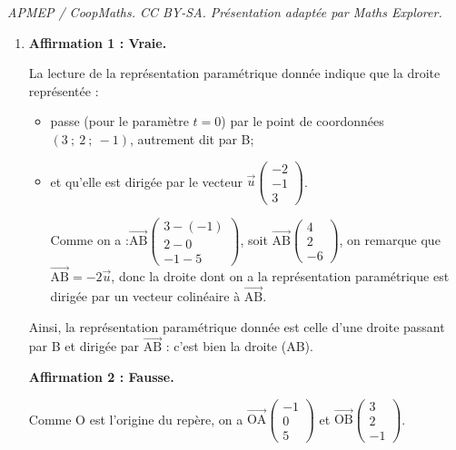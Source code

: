 \documentclass[10pt]{article}
\providecommand{\vect}[1]{\overrightarrow{#1}}
\begin{document}
\noindent\textit{APMEP / CoopMaths. CC BY-SA. Présentation adaptée par Maths Explorer.}\par\medskip
\medskip

\begin{enumerate}
	\item \textbf{Affirmation 1 : Vraie.}

	La lecture de la représentation paramétrique donnée indique que la droite représentée :
	\begin{itemize}
		\item passe (pour le paramètre $t=0$) par le point de coordonnées $(3 ~;~ 2 ~;~ -1)$, autrement dit par B;
		\item et qu'elle est dirigée par le vecteur $\vect{u} \begin{pmatrix}-2 \\-1 \\ 3\end{pmatrix}$.

		Comme on a :\quad $\vect{\mathrm{AB}} \begin{pmatrix} 3 - (-1) \\ 2 - 0 \\ -1 - 5\end{pmatrix}$, soit $\vect{\mathrm{AB}} \begin{pmatrix} 4 \\ 2 \\ -6\end{pmatrix}$, on remarque que $\vect{\mathrm{AB}} = -2\vect{u}$, donc la droite dont on a la représentation paramétrique est dirigée par un vecteur colinéaire à $\vect{\mathrm{AB}}$.
	\end{itemize}

	Ainsi, la représentation paramétrique donnée est celle d'une droite passant par B et dirigée par $\vect{\mathrm{AB}}$ : c'est bien la droite (AB).

	\medskip

	\textbf{Affirmation 2 : Fausse.}

	Comme O est l'origine du repère, on a $\vect{\mathrm{OA}}\begin{pmatrix} -1 \\ 0 \\ 5	\end{pmatrix}$ et $\vect{\mathrm{OB}}\begin{pmatrix} 3 \\ 2 \\ -1	\end{pmatrix}$.


\end{enumerate}
\end{document}
